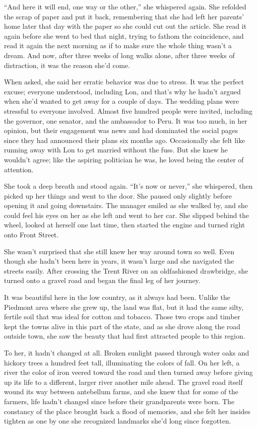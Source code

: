 \documentclass[10pt, twoside, openright]{book}
\begin{document}
``And here it will end, one way or the other,'' she whispered again. She
refolded the scrap of paper and put it back, remembering that she had
left her parents' home later that day with the paper so she could cut
out the article. She read it again before she went to bed that night,
trying to fathom the coincidence, and read it again the next morning as
if to make sure the whole thing wasn't a dream. And now, after three
weeks of long walks alone, after three weeks of distraction, it was the
reason she'd come.

When asked, she said her erratic behavior was due to stress. It was the
perfect excuse; everyone understood, including Lon, and that's why he
hadn't argued when she'd wanted to get away for a couple of days. The
wedding plans were stressful to everyone involved. Almost five hundred
people were invited, including the governor, one senator, and the
ambassador to Peru. It was too much, in her opinion, but their
engagement was news and had dominated the social pages since they had
announced their plans six months ago. Occasionally she felt like running
away with Lon to get married without the fuss. But she knew he wouldn't
agree; like the aspiring politician he was, he loved being the center of
attention.

She took a deep breath and stood again. ``It's now or never,'' she
whispered, then picked up her things and went to the door. She paused
only slightly before opening it and going downstairs. The manager smiled
as she walked by, and she could feel his eyes on her as she left and
went to her car. She slipped behind the wheel, looked at herself one
last time, then started the engine and turned right onto Front Street.

She wasn't surprised that she still knew her way around town so well.
Even though she hadn't been here in years, it wasn't large and she
navigated the streets easily. After crossing the Trent River on an
oldfashioned drawbridge, she turned onto a gravel road and began the
final leg of her journey.

It was beautiful here in the low country, as it always had been. Unlike
the Piedmont area where she grew up, the land was flat, but it had the
same silty, fertile soil that was ideal for cotton and tobacco. Those
two crops and timber kept the towns alive in this part of the state, and
as she drove along the road outside town, she saw the beauty that had
first attracted people to this region.

To her, it hadn't changed at all. Broken sunlight passed through water
oaks and hickory trees a hundred feet tall, illuminating the colors of
fall. On her left, a river the color of iron veered toward the road and
then turned away before giving up its life to a different, larger river
another mile ahead. The gravel road itself wound its way between
antebellum farms, and she knew that for some of the farmers, life hadn't
changed since before their grandparents were born. The constancy of the
place brought back a flood of memories, and she felt her insides tighten
as one by one she recognized landmarks she'd long since forgotten.
\end{document}
